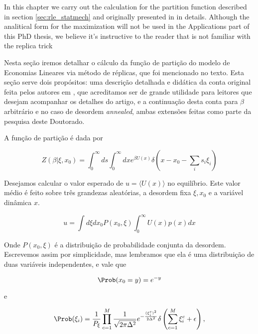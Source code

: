 In this chapter we carry out the calculation for the partition function described in section \ref{sec:rle_statmech} and originally presented in \cite{DeMartinoMarsili04} in details. Although the analitical form for the maximization will not be used in the Applications part of this PhD thesis, we believe it's instructive to the reader that is not familiar with the replica trick 

  Nesta seção iremos detalhar o cálculo da função de partição do
  modelo de Economias Lineares via método de réplicas, que foi
  mencionado no texto. Esta seção serve dois propósitos: uma descrição
  detalhada e didática da conta original feita pelos autores em
  \cite{DeMartinoMarsili04}, que acreditamos ser de grande utilidade
  para leitores que desejam acompanhar os detalhes do artigo, e a
  continuação desta conta para $\beta$ arbitrário e no caso de
  desordem \emph{annealed}, ambas extensões feitas como parte da
  pesquisa deste Doutorado.

  A função de partição é dada por

  \begin{equation}
    \label{eq:appZ}
    Z(\beta | \xi, x_0) = \int_0^\infty ds \int_0^\infty dx e^{\beta U(x)} \delta\left(x - x_0 - \sum_i s_i \xi_i \right)
  \end{equation}

  Desejamos calcular o valor esperado de $u = \langle U(x) \rangle$ no
  equilíbrio. Este valor médio é feito sobre três grandezas
  aleatórias, a desordem fixa $\xi, x_0$ e a variável dinâmica $x$.

  \begin{equation}
    \label{eq:20}
    u = \int d\xi dx_0 P(x_0, \xi) \int_0^\infty U(x) p(x) dx
  \end{equation}

  Onde $P(x_0, \xi)$ é a distribuição de probabilidade conjunta da desordem. Escrevemos
  assim por simplicidade, mas lembramos que ela é uma distribuição de
  duas variáveis independentes, e vale que

  \begin{equation}
    \label{eq:24}
    \Prob(x_0 = y) = e^{-y}
  \end{equation}

  e

  \begin{equation}
    \label{eq:25}
    \Prob(\xi_i) = \frac{1}{P_\xi} \prod_{c=1}^M \frac{1}{\sqrt{2\pi \Delta^2}}e^{-\frac{(\xi_i^c)^2}{2\Delta^2}}
    \delta\left(\sum_{c=1}^M \xi_i^c + \epsilon\right),
  \end{equation}

